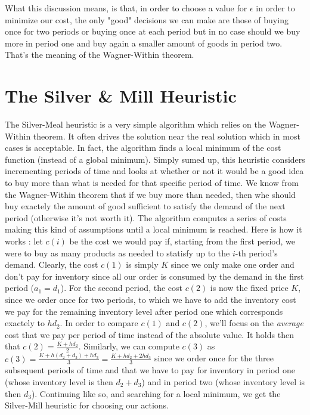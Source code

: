 What this discussion means, is that, in order to choose a value for $\epsilon$ in order to minimize our cost, the only "good" decisions we can make are those of buying once for two periods or buying once at each period but in no case should we buy more in period one and buy again a smaller amount of goods in period two. That's the meaning of the Wagner-Within theorem.

\section{The Silver \& Mill Heuristic}

The Silver-Meal heuristic is a very simple algorithm which relies on the Wagner-Within theorem. It often drives the solution near the real solution which in most cases is acceptable. In fact, the algorithm finds a local minimum of the cost function (instead of a global minimum). Simply sumed up, this heuristic considers incrementing periods of time and looks at whether or not it would be a good idea to buy more than what is needed for that specific period of time. We know from the Wagner-Within theorem that if we buy more than needed, then whe should buy exactely the amount of good sufficient to satisfy the demand of the next period (otherwise it's not worth it). The algorithm computes a series of costs making this kind of assumptions until a local minimum is reached. Here is how it works : let $c(i)$ be the cost we would pay if, starting from the first period, we were to buy as many products as needed to statisfy up to the $i$-th period's demand. Clearly, the cost $c(1)$ is simply $K$ since we only make one order and don't pay for inventory since all our order is consumed by the demand in the first period ($a_1=d_1$). For the second period, the cost $c(2)$ is now the fixed price $K$, since we order once for two periods, to which we have to add the inventory cost we pay for the remaining inventory level after period one which corresponds exactely to $hd_2$. In order to compare $c(1)$ and $c(2)$, we'll focus on the \emph{average} cost that we pay per period of time instead of the absolute value. It holds then that $c(2) = \frac{K+hd_2}{2}$. Similarly, we can compute $c(3)$ as $c(3) = \frac{K + h(d_2+d_3) + hd_3}{3}=\frac{K+hd_2+2hd_3}{3}$ since we order once for the three subsequent periods of time and that we have to pay for inventory in period one (whose inventory level is then $d_2+d_3$) and in period two (whose inventory level is then $d_3$). Continuing like so, and searching for a local minimum, we get the Silver-Mill heuristic for choosing our actions. 

